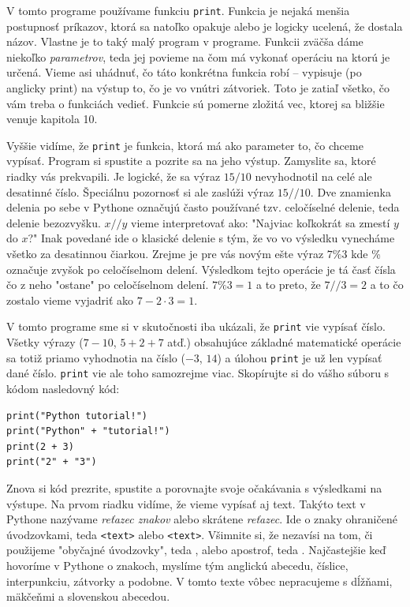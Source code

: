 \documentclass{article}
\begin{document}
V tomto programe používame funkciu \texttt{print}. Funkcia je nejaká menšia postupnosť príkazov, ktorá sa natoľko opakuje alebo je logicky ucelená, že dostala názov. Vlastne je to taký malý program v programe. Funkcii zväčša dáme niekoľko \textit{parametrov}, teda jej povieme na čom má vykonať operáciu na ktorú je určená. Vieme asi uhádnuť, čo táto konkrétna funkcia robí -- vypisuje (po anglicky print) na výstup to, čo je vo vnútri zátvoriek. Toto je zatiaľ všetko, čo vám treba o funkciách vedieť. Funkcie sú pomerne zložitá vec, ktorej sa bližšie venuje kapitola 10.

Vyššie vidíme, že \texttt{print} je funkcia, ktorá má ako parameter to, čo chceme vypísať. Program si spustite a pozrite sa na jeho výstup. Zamyslite sa, ktoré riadky vás prekvapili. Je logické, že sa výraz $15 / 10$ nevyhodnotil na celé ale desatinné číslo. Špeciálnu pozornosť si ale zaslúži výraz $15 // 10$. Dve znamienka delenia po sebe v Pythone označujú často používané tzv. celočíselné delenie, teda delenie bezozvyšku. $x // y$ vieme interpretovať ako: "Najviac koľkokrát sa zmestí $y$ do $x$?" Inak povedané ide o klasické delenie s tým, že vo vo výsledku vynecháme všetko za desatinnou čiarkou. Zrejme je pre vás novým ešte výraz $7 \% 3$ kde \% označuje zvyšok po celočíselnom delení. Výsledkom tejto operácie je tá časť čísla čo z neho "ostane" po celočíselnom delení. $7\%3=1$ a to preto, že $7//3=2$ a to čo zostalo vieme vyjadriť ako $7 - 2 \cdot 3 = 1$.

V tomto programe sme si v skutočnosti iba ukázali, že \texttt{print} vie vypísať číslo. Všetky výrazy ($7-10$, $5+2+7$ atď.) obsahujúce základné matematické operácie sa totiž priamo vyhodnotia na číslo ($-3$, $14$) a úlohou \texttt{print} je už len vypísať dané číslo. \texttt{print} vie ale toho samozrejme viac. Skopírujte si do vášho súboru s kódom nasledovný kód:

\begin{lstlisting}
print("Python tutorial!")
print("Python" + "tutorial!")
print(2 + 3)
print("2" + "3")
\end{lstlisting}

Znova si kód prezrite, spustite a porovnajte svoje očakávania s výsledkami na výstupe. Na prvom riadku vidíme, že vieme vypísať aj text. Takýto text v Pythone nazývame \textit{reťazec znakov} alebo skrátene \textit{reťazec}. Ide o znaky ohraničené úvodzovkami, teda \texttt{\textquotedbl<text>\textquotedbl} alebo \texttt{\textquotesingle<text>\textquotesingle}. Všimnite si, že nezavísi na tom, či použijeme "obyčajné úvodzovky", teda \texttt{\textquotedbl}, alebo apostrof, teda \textquotesingle. Najčastejšie keď hovoríme v Pythone o znakoch, myslíme tým anglickú abecedu, číslice, interpunkciu, zátvorky a podobne. V tomto texte vôbec nepracujeme s dĺžňami, mäkčeňmi a slovenskou abecedou.
\end{document}

